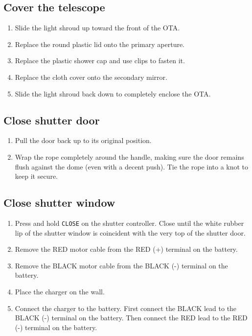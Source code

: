 \documentclass{article}
\begin{document}
	\subsection{Cover the telescope}

		\begin{enumerate}

			\item Slide the light shroud up toward the front of the OTA.

			\item Replace the round plastic lid onto the primary aperture.

			\item Replace the plastic shower cap and use clips to fasten it.

			\item Replace the cloth cover onto the secondary mirror.

			\item Slide the light shroud back down to completely enclose the OTA.

		\end{enumerate}

	\subsection{Close shutter door}

		\begin{enumerate}

			\item Pull the door back up to its original position.

			\item Wrap the rope completely around the handle, making sure the door remains flush against the dome (even with a decent push). Tie the rope into a knot to keep it secure.

		\end{enumerate}

	\subsection{Close shutter window}

		\begin{enumerate}

			\item Press and hold \texttt{CLOSE} on the shutter controller. Close until the white rubber lip of the shutter window is coincident with the very top of the shutter door.

			\item Remove the RED motor cable from the RED (+) terminal on the battery.

			\item Remove the BLACK motor cable from the BLACK (-) terminal on the battery.

			\item Place the charger on the wall.

			\item Connect the charger to the battery. First connect the BLACK lead to the BLACK (-) terminal on the battery. Then connect the RED lead to the RED (-) terminal on the battery.

		\end{enumerate}
\end{document}
